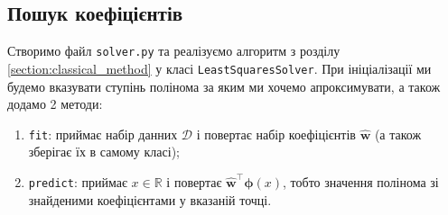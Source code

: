 \documentclass[12pt]{extarticle}
\begin{document}
\subsection{Пошук коефіцієнтів}

Створимо файл \texttt{solver.py} та реалізуємо алгоритм з розділу \ref{section:classical_method} у класі \texttt{LeastSquaresSolver}. При ініціалізації ми будемо вказувати ступінь полінома за яким ми хочемо апроксимувати, а також додамо 2 методи:
\begin{enumerate}
    \item \texttt{fit}: приймає набір данних $\mathcal{D}$ і повертає набір коефіцієнтів $\hat{\mathbf{w}}$ (а також зберігає їх в самому класі);
    \item \texttt{predict}: приймає $x\in \mathbb{R}$ і повертає $\hat{\mathbf{w}}^{\top}\boldsymbol{\phi}(x)$, тобто значення полінома зі знайденими коефіцієнтами у вказаній точці.
\end{enumerate}
\end{document}

